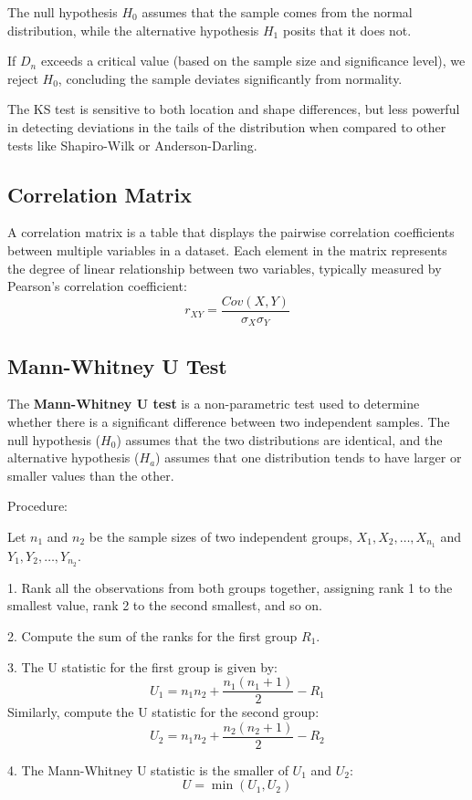\documentclass[conference]{IEEEtran}
\begin{document}
The null hypothesis $H_0$ assumes that the sample comes from the normal distribution, while the alternative hypothesis $H_1$ posits that it does not.

    If $D_n$ exceeds a critical value (based on the sample size and significance level), we reject $H_0$, concluding the sample deviates significantly from normality.

The KS test is sensitive to both location and shape differences, but less powerful in detecting deviations in the tails of the distribution when compared to other tests like Shapiro-Wilk or Anderson-Darling.

\subsection{Correlation Matrix}
A correlation matrix is a table that displays the pairwise correlation coefficients between multiple variables in a dataset. Each element in the matrix represents the degree of linear relationship between two variables, typically measured by Pearson's correlation coefficient:
\[r_{XY} = \frac{Cov(X,Y)}{\sigma_X\sigma_Y}\]

\subsection{Mann-Whitney U Test}
The \textbf{Mann-Whitney U test} is a non-parametric test used to determine whether there is a significant difference between two independent samples. The null hypothesis (\(H_0\)) assumes that the two distributions are identical, and the alternative hypothesis (\(H_a\)) assumes that one distribution tends to have larger or smaller values than the other.


Procedure:

Let \( n_1 \) and \( n_2 \) be the sample sizes of two independent groups, \( X_1, X_2, \dots, X_{n_1} \) and \( Y_1, Y_2, \dots, Y_{n_2} \).

1. Rank all the observations from both groups together, assigning rank 1 to the smallest value, rank 2 to the second smallest, and so on.

2. Compute the sum of the ranks for the first group \( R_1 \).

3. The U statistic for the first group is given by:
\[
U_1 = n_1 n_2 + \frac{n_1(n_1 + 1)}{2} - R_1
\]
Similarly, compute the U statistic for the second group:
\[
U_2 = n_1 n_2 + \frac{n_2(n_2 + 1)}{2} - R_2
\]

4. The Mann-Whitney U statistic is the smaller of \( U_1 \) and \( U_2 \):
\[
U = \min(U_1, U_2)
\]
\end{document}
